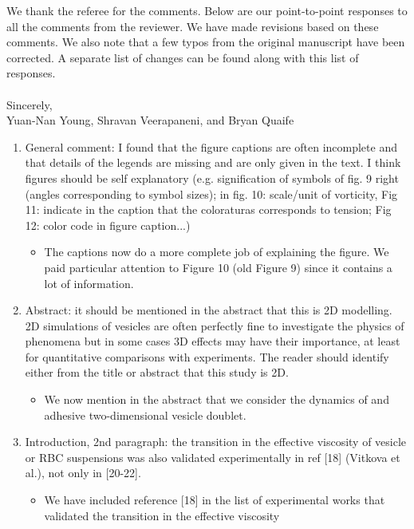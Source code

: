 \documentclass[11pt]{article}
\newcommand{\comment}[1]{{\color{blue} #1}}
\begin{document}
\noindent
We thank the referee for the comments.  Below are our point-to-point responses to 
all the comments from the reviewer.  We have made revisions based on these comments.
We also note that a few typos from the original manuscript have
been corrected.  A separate list of changes can be found along with this list of responses.
\\ \\ \noindent 
Sincerely, \\ \noindent
Yuan-Nan Young, Shravan Veerapaneni, and Bryan Quaife

\vspace{20pt}

\begin{enumerate}
\item\comment{General comment: I found that the figure captions are often
incomplete and that details of the legends are missing and are only
given in the text. I think figures should be self explanatory (e.g.
signification of symbols of fig. 9 right (angles corresponding to symbol
sizes); in fig. 10: scale/unit of vorticity, Fig 11: indicate in the
caption that the coloraturas corresponds to tension; Fig 12: color code
in figure caption...)}
\begin{itemize}
  \item The captions now do a more complete job of explaining the
    figure.  We paid particular attention to Figure 10 (old Figure 9)
    since it contains a lot of information.
\end{itemize}

\item\comment{Abstract: it should be mentioned in the abstract that this is
2D modelling. 2D simulations of vesicles are often perfectly fine to
investigate the physics of phenomena but in some cases 3D effects may
have their importance, at least for quantitative comparisons with
experiments. The reader should identify either from the title or
abstract that this study is 2D.}
\begin{itemize}
  \item We now mention in the abstract that we consider the dynamics of
    and adhesive two-dimensional vesicle doublet.
\end{itemize}

\item\comment{Introduction, 2nd paragraph: the transition in the effective
viscosity of vesicle or RBC suspensions was also validated
experimentally in ref [18] (Vitkova et al.), not only in [20-22].}
\begin{itemize}
  \item We have included reference [18] in the list of experimental
    works that validated the transition in the effective viscosity
\end{itemize}


\end{enumerate}
\end{document}
